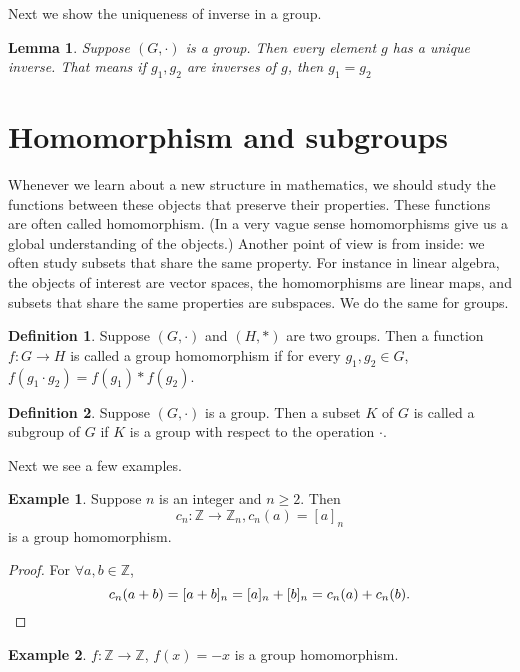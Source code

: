 \documentclass{article}
\theoremstyle{plain}
\newtheorem{lemma}{Lemma}
\theoremstyle{definition}
\newtheorem*{definition}{Definition}
\newtheorem{example}{Example}
\begin{document}
Next we show the uniqueness of inverse in a group.

\begin{lemma}
    Suppose $(G,\cdot)$ is a group. Then every element
    $g$ has a unique inverse. That means if $g_1,g_2$
    are inverses of $g$, then $g_1=g_2$
\end{lemma}


\section{Homomorphism and subgroups}

Whenever we learn about a new structure in mathematics, we 
should study the functions between these objects that preserve
their properties. These functions are often called homomorphism.
(In a very vague sense homomorphisms give us a global understanding
of the objects.) Another point of view is from inside:
we often study subsets that share the same property. For
instance in linear algebra, the objects of interest are vector
spaces, the homomorphisms are linear maps, and subsets that
share the same properties are subspaces. We do the same for groups.

\begin{definition}
    Suppose $(G,\cdot)$ and $(H,*)$ are two groups.
    Then a function $f:G\to H$ is called a group homomorphism if 
    for every $g_1,g_2\in G$, $f(g_1\cdot g_2)=f(g_1)*f(g_2)$.
\end{definition}

\begin{definition}
    Suppose $(G,\cdot)$ is a group. Then a subset $K$ of $G$
    is called a subgroup of $G$ if $K$ is a group with respect to the
    operation $\cdot$.
\end{definition}

Next we see a few examples.

\begin{example}
    Suppose $n$ is an integer and $n\geq 2$. Then
    \[c_n:\mathbb{Z}\to\mathbb{Z}_n,c_n(a)=[a]_n\]
    is a group homomorphism.
\end{example}

\begin{proof}
    For $\forall a,b\in\mathbb{Z}$,
    \[c_n(a+b)=[a+b]_n=[a]_n+[b]_n=c_n(a)+c_n(b).\qedhere\]
\end{proof}

\begin{example}
    $f:\mathbb{Z}\to\mathbb{Z}$, $f(x)=-x$ is a group homomorphism.
\end{example}
\end{document}
